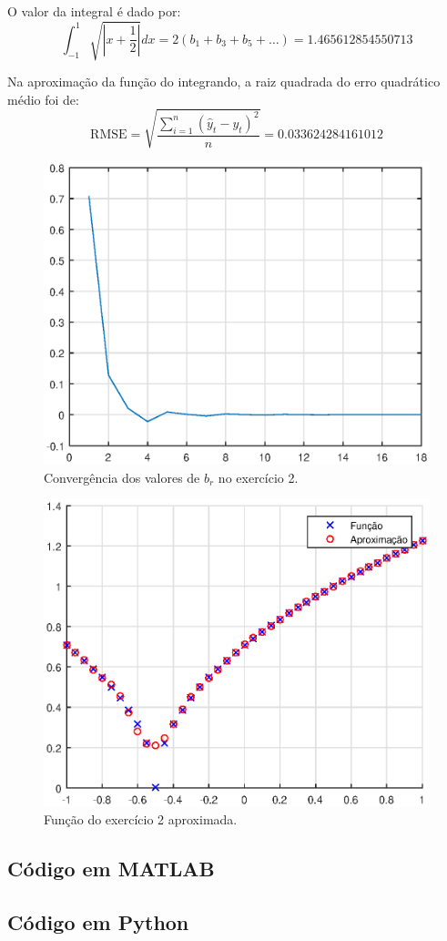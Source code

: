 \documentclass[10pt,a4paper]{article}
\begin{document}
    O valor da integral é dado por:
    	\[\int_{-1}^1 \sqrt{\left|x+\frac{1}{2}\right|} dx = 2\left(b_1+b_3+b_5+\dots\right)=1.465612854550713\]
        
        Na aproximação da função do integrando, a raiz quadrada do erro quadrático médio foi de:
       \[\mbox{RMSE} = \sqrt{\frac{\sum_{i=1}^n\left(\hat{y}_t-y_t\right)^2}{n}} = 0.033624284161012\]
    
    \begin{figure}
    \centering
      \includegraphics[width=0.8\linewidth]{figures/f2.eps}
      \caption{Convergência dos valores de $b_r$ no exercício 2.}
      \label{fig:f2br}
	\end{figure}
    
    \begin{figure}
    \centering
      \includegraphics[width=0.8\linewidth]{figures/ap2.eps}
      \caption{Função do exercício 2 aproximada.}
      \label{fig:ap2br}
	\end{figure}
    
    \newpage
    \subsection{Código em MATLAB}
    
    
    \newpage
    \subsection{Código em Python}
    
    
\end{document}

